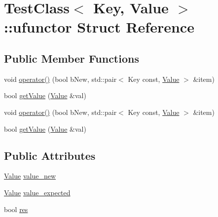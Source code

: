 \hypertarget{struct_test_class_1_1ufunctor}{}\section{Test\+Class$<$ Key, Value $>$\+:\+:ufunctor Struct Reference}
\label{struct_test_class_1_1ufunctor}
\subsection*{Public Member Functions}
\begin{DoxyCompactItemize}
\item 
void \hyperlink{struct_test_class_1_1ufunctor_ade6b9410e3e0a3ad0ae828191bc48ad3}{operator()} (bool b\+New, std\+::pair$<$ Key const, \hyperlink{hash__map_2test_object_8h_ad777bf08d8e2b01df17ba5e3c51ae11f}{Value} $>$ \&item)
\item 
bool \hyperlink{struct_test_class_1_1ufunctor_a3558610685e499bc8eed55b6233288c3}{get\+Value} (\hyperlink{hash__map_2test_object_8h_ad777bf08d8e2b01df17ba5e3c51ae11f}{Value} \&val)
\item 
void \hyperlink{struct_test_class_1_1ufunctor_ade6b9410e3e0a3ad0ae828191bc48ad3}{operator()} (bool b\+New, std\+::pair$<$ Key const, \hyperlink{hash__map_2test_object_8h_ad777bf08d8e2b01df17ba5e3c51ae11f}{Value} $>$ \&item)
\item 
bool \hyperlink{struct_test_class_1_1ufunctor_a3558610685e499bc8eed55b6233288c3}{get\+Value} (\hyperlink{hash__map_2test_object_8h_ad777bf08d8e2b01df17ba5e3c51ae11f}{Value} \&val)
\end{DoxyCompactItemize}
\subsection*{Public Attributes}
\begin{DoxyCompactItemize}
\item 
\hyperlink{hash__map_2test_object_8h_ad777bf08d8e2b01df17ba5e3c51ae11f}{Value} \hyperlink{struct_test_class_1_1ufunctor_a4c5053777eaa7f62544ce25386ef693c}{value\+\_\+new}
\item 
\hyperlink{hash__map_2test_object_8h_ad777bf08d8e2b01df17ba5e3c51ae11f}{Value} \hyperlink{struct_test_class_1_1ufunctor_a7bd0f4a31fe5da27398cb0131c96a24f}{value\+\_\+expected}
\item 
bool \hyperlink{struct_test_class_1_1ufunctor_a79e2114e0034baeb8f3bd30f16a2f6b8}{res}
\end{DoxyCompactItemize}


